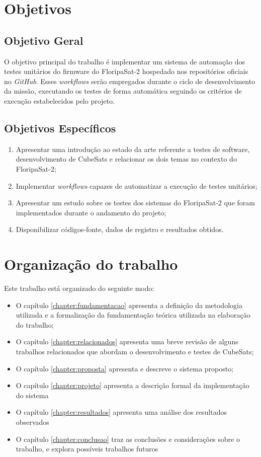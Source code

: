 \section{Objetivos}

\subsection{Objetivo Geral}

O objetivo principal do trabalho é implementar um sistema de automação dos testes unitários do firmware do FloripaSat-2 hospedado nos repositórios oficiais no \textit{GitHub}. Esses \textit{workflows} serão empregados durante o ciclo de desenvolvimento da missão, executando os testes de forma automática seguindo os critérios de execução estabelecidos pelo projeto.

\subsection{Objetivos Específicos}

\begin{enumerate}
    \item Apresentar uma introdução ao estado da arte referente a testes de software, desenvolvimento de CubeSats e relacionar os dois temas no contexto do FloripaSat-2;
    \item Implementar \textit{workflows} capazes de automatizar a execução de testes unitários;
    \item Apresentar um estudo sobre os testes dos sistemas do FloripaSat-2 que foram implementados durante o andamento do projeto;
    \item Disponibilizar códigos-fonte, dados de registro e resultados obtidos.
\end{enumerate}
\section{Organização do trabalho}

Este trabalho está organizado do seguinte modo:

\begin{itemize}
    \item O capítulo \ref{chapter:fundamentacao} apresenta a definição da metodologia utilizada e a formalização da fundamentação teórica utilizada na elaboração do trabalho;
    \item O capítulo \ref{chapter:relacionados} apresenta uma breve revisão de alguns trabalhos relacionados que abordam o desenvolvimento e testes de CubeSats;
    \item O capítulo \ref{chapter:proposta} apresenta e descreve o sistema proposto;
    \item O capítulo \ref{chapter:projeto} apresenta a descrição formal da implementação do sistema
    \item O capítulo \ref{chapter:resultados} apresenta uma análise dos resultados observados
    \item O capítulo \ref{chapter:conclusao} traz as conclusões e considerações sobre o trabalho, e explora possíveis trabalhos futuros
\end{itemize}
